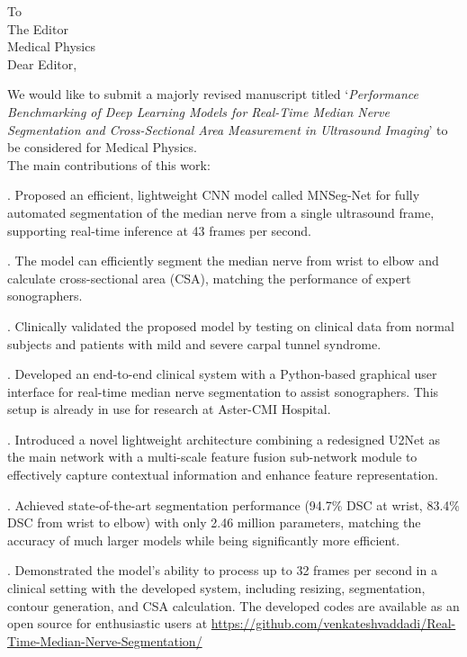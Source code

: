 \documentclass[float=false, crop=false]{standalone}
\begin{document}
\begin{large}
\noindent
To\\
The Editor\\
Medical Physics \\




\noindent
Dear Editor,

\par
We would like to submit a majorly revised manuscript titled `\emph{Performance Benchmarking of Deep Learning Models for Real-Time Median Nerve Segmentation and Cross-Sectional Area Measurement in Ultrasound Imaging}' to be considered for Medical Physics. \\


\noindent
The main contributions of this work:

. Proposed an efficient, lightweight CNN model called MNSeg-Net for fully automated segmentation of the median nerve from a single ultrasound frame, supporting real-time inference at 43 frames per second.

. The model can efficiently segment the median nerve from wrist to elbow and calculate cross-sectional area (CSA), matching the performance of expert sonographers.

. Clinically validated the proposed model by testing on clinical data from normal subjects and patients with mild and severe carpal tunnel syndrome.

. Developed an end-to-end clinical system with a Python-based graphical user interface for real-time median nerve segmentation to assist sonographers. This setup is already in use for research at Aster-CMI Hospital.

. Introduced a novel lightweight architecture combining a redesigned U2Net as the main network with a multi-scale feature fusion sub-network module to effectively capture contextual information and enhance feature representation.

. Achieved state-of-the-art segmentation performance (94.7\% DSC at wrist, 83.4\% DSC from wrist to elbow) with only 2.46 million parameters, matching the accuracy of much larger models while being significantly more efficient.

. Demonstrated the model's ability to process up to 32 frames per second in a clinical setting with the developed system, including resizing, segmentation, contour generation, and CSA calculation. The developed codes are available as an open source for enthusiastic users at \href{https://github.com/venkateshvaddadi/Real-Time-Median-Nerve-Segmentation/}{https://github.com/venkateshvaddadi/Real-Time-Median-Nerve-Segmentation/}\\


\end{large}
\end{document}
